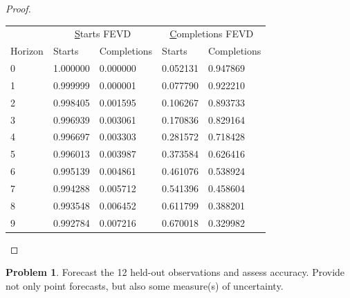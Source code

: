\documentclass[oneside,reqno]{amsart}
\theoremstyle{definition}
\newtheorem{prob}{Problem}
\begin{document}
\begin{proof}
\begin{table}
\begin{tabular}{lllll}
 & \multicolumn{2}{c}{{\ul Starts FEVD}} & \multicolumn{2}{c}{{\ul Completions FEVD}} \\
Horizon & Starts & Completions & Starts & Completions \\ \hline
0 & 1.000000  & 0.000000  & 0.052131 & 0.947869 \\
1 &  0.999999   &  0.000001 & 0.077790  & 0.922210  \\
2 &  0.998405    & 0.001595   & 0.106267  & 0.893733  \\
3 &  0.996939   &  0.003061  &  0.170836  &   0.829164  \\
4 &  0.996697  &   0.003303  &  0.281572   & 0.718428  \\
5 &  0.996013   &  0.003987  &  0.373584  &   0.626416  \\
6 &  0.995139  &   0.004861  &   0.461076  &   0.538924  \\
7 &  0.994288   &  0.005712  &  0.541396   &  0.458604  \\
8 &  0.993548  &   0.006452  &   0.611799  &   0.388201  \\
9 &  0.992784  &   0.007216  &  0.670018  &   0.329982 \\ \hline
\end{tabular}
\label{fevd}
\end{table}
\end{proof}

\begin{prob}
Forecast the 12 held-out observations and assess accuracy. Provide not only point forecasts, but also some measure(s) of uncertainty.
\end{prob}
\end{document}
